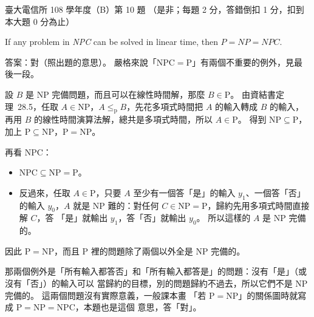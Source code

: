 \begin{pastexam}[label={px:ntu-108-comm-dsab-10}]{臺大電信所 108 學年度（B）第 10 題}
（是非；每題 2 分，答錯倒扣 1 分，扣到本大題 0 分為止）

If any problem in \textit{NPC} can be solved in linear time, then $P=NP=NPC$.
\end{pastexam}

\begin{pastsoln}
答案：對（照出題的意思）。 嚴格來說「$\mathrm{NPC} = \mathrm{P}$」有兩個不重要的例外，見最後一段。

設 $B$ 是 NP 完備問題，而且可以在線性時間解，那麼 $B \in \mathrm{P}$。 由資結書定理~28.5，任取
$A \in \mathrm{NP}$，$A \le_{\mathrm{p}} B$，先花多項式時間把 $A$ 的輸入轉成 $B$ 的輸入，再用 $B$
的線性時間演算法解，總共是多項式時間，所以 $A \in \mathrm{P}$。 得到
$\mathrm{NP} \subseteq \mathrm{P}$，加上 $\mathrm{P} \subseteq \mathrm{NP}$，$\mathrm{P} = \mathrm{NP}$。

再看 NPC：
\begin{itemize}
\item $\mathrm{NPC} \subseteq \mathrm{NP} = \mathrm{P}$。
\item 反過來，任取 $A \in \mathrm{P}$，只要 $A$ 至少有一個答「是」的輸入 $y_1$、一個答「否」的輸入
$y_0$，$A$ 就是 NP 難的：對任何 $C \in \mathrm{NP} = \mathrm{P}$，歸約先用多項式時間直接解 $C$，答
「是」就輸出 $y_1$，答「否」就輸出 $y_0$。 所以這樣的 $A$ 是 NP 完備的。
\end{itemize}
因此 $\mathrm{P} = \mathrm{NP}$，而且 P 裡的問題除了兩個以外全是 NP 完備的。

那兩個例外是「所有輸入都答否」和「所有輸入都答是」的問題：沒有「是」（或沒有「否」）的輸入可以
當歸約的目標，別的問題歸約不過去，所以它們不是 NP 完備的。 這兩個問題沒有實際意義，一般課本畫
「若 $\mathrm{P} = \mathrm{NP}$」的關係圖時就寫成 $\mathrm{P} = \mathrm{NP} = \mathrm{NPC}$，本題也是這個
意思，答「對」。
\end{pastsoln}
